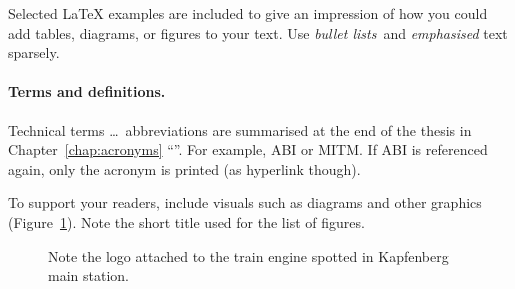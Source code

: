 Selected \LaTeX{} examples are included to give an impression of how you could add tables, diagrams, or figures to your text. Use \emph{bullet lists} and \emph{emphasised} text sparsely. 



\paragraph{Terms and definitions.}
Technical terms \ldots\ abbreviations are summarised at the end of the thesis in Chapter~\ref{chap:acronyms} ``''. For example, \ac{ABI} or \ac{MITM}. If \ac{ABI} is referenced again, only the acronym is printed (as hyperlink though).

To support your readers, include visuals such as diagrams and other graphics (Figure~\ref{fig:engine}). Note the short title used for the list of figures.




\begin{figure}[tp]
  \centering
 \caption[Logo at the Train Engine]{Note the logo attached to the train engine spotted in Kapfenberg main station.}
  \label{fig:engine}
\end{figure}

